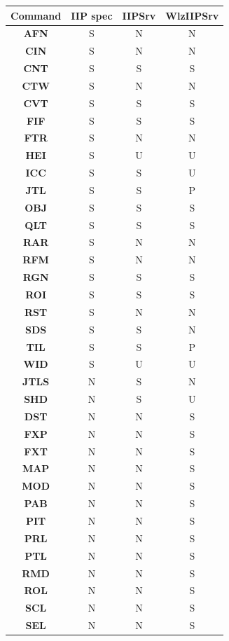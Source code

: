 \documentclass[11pt]{article}
\newcommand{\com}[1]{\textbf{#1}}
\begin{document}
\begin{table}[!hp]
\centering
\tiny{
\begin{tabular}{|c|c|c|c|}
\hline
\textbf{Command} &  \textbf{IIP spec} & \textbf{IIPSrv} & \textbf{WlzIIPSrv}\\
\hline
\com{AFN}  & S & N & N \\
\com{CIN}  & S & N & N \\
\com{CNT}  & S & S & S \\
\com{CTW}  & S & N & N \\
\com{CVT}  & S & S & S \\
\com{FIF}  & S & S & S \\
\com{FTR}  & S & N & N \\
\com{HEI}  & S & U & U \\
\com{ICC}  & S & S & U \\
\com{JTL}  & S & S & P \\
\com{OBJ}  & S & S & S \\
\com{QLT}  & S & S & S \\
\com{RAR}  & S & N & N \\
\com{RFM}  & S & N & N \\
\com{RGN}  & S & S & S \\
\com{ROI}  & S & S & S \\
\com{RST}  & S & N & N \\
\com{SDS}  & S & S & N \\
\com{TIL}  & S & S & P \\
\com{WID}  & S & U & U \\
\hline
\com{JTLS} & N & S & N \\
\com{SHD}  & N & S & U \\
\hline
\com{DST}  & N & N & S \\
\com{FXP}  & N & N & S \\
\com{FXT}  & N & N & S \\
\com{MAP}  & N & N & S \\
\com{MOD}  & N & N & S \\
\com{PAB}  & N & N & S \\
\com{PIT}  & N & N & S \\
\com{PRL}  & N & N & S \\
\com{PTL}  & N & N & S \\
\com{RMD}  & N & N & S \\
\com{ROL}  & N & N & S \\
\com{SCL}  & N & N & S \\
\com{SEL}  & N & N & S \\

\end{tabular}}
\end{table}
\end{document}
